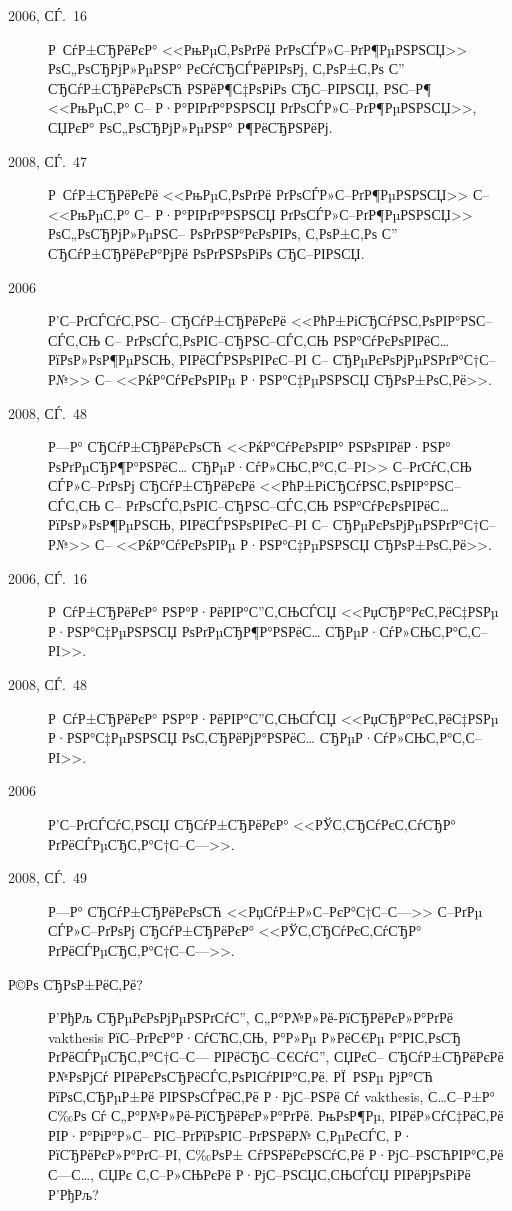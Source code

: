 \documentclass[a4paper]{article}
\newcommand{\vakthesis}{\textsf{vakthesis}}
\begin{document}
\begin{description}
\item[2006, СЃ.~16] Р СѓР±СЂРёРєР° <<РњРµС‚РѕРґРё РґРѕСЃР»С–РґР¶РµРЅРЅСЏ>> РѕС„РѕСЂРјР»РµРЅР° РєСѓСЂСЃРёРІРѕРј,
  С‚РѕР±С‚Рѕ С” СЂСѓР±СЂРёРєРѕСЋ РЅРёР¶С‡РѕРіРѕ СЂС–РІРЅСЏ, РЅС–Р¶ <<РњРµС‚Р° С– Р·Р°РІРґР°РЅРЅСЏ РґРѕСЃР»С–РґР¶РµРЅРЅСЏ>>,
  СЏРєР° РѕС„РѕСЂРјР»РµРЅР° Р¶РёСЂРЅРёРј.

\item[2008, СЃ.~47] Р СѓР±СЂРёРєРё <<РњРµС‚РѕРґРё РґРѕСЃР»С–РґР¶РµРЅРЅСЏ>> С– <<РњРµС‚Р° С– Р·Р°РІРґР°РЅРЅСЏ
  РґРѕСЃР»С–РґР¶РµРЅРЅСЏ>> РѕС„РѕСЂРјР»РµРЅС– РѕРґРЅР°РєРѕРІРѕ, С‚РѕР±С‚Рѕ С” СЂСѓР±СЂРёРєР°РјРё РѕРґРЅРѕРіРѕ СЂС–РІРЅСЏ.

\item[2006] Р’С–РґСЃСѓС‚РЅС– СЂСѓР±СЂРёРєРё <<РћР±РіСЂСѓРЅС‚РѕРІР°РЅС–СЃС‚СЊ С– РґРѕСЃС‚РѕРІС–СЂРЅС–СЃС‚СЊ
  РЅР°СѓРєРѕРІРёС… РїРѕР»РѕР¶РµРЅСЊ, РІРёСЃРЅРѕРІРєС–РІ С– СЂРµРєРѕРјРµРЅРґР°С†С–Р№>> С– <<РќР°СѓРєРѕРІРµ Р·РЅР°С‡РµРЅРЅСЏ
  СЂРѕР±РѕС‚Рё>>.

\item[2008, СЃ.~48] Р—Р° СЂСѓР±СЂРёРєРѕСЋ <<РќР°СѓРєРѕРІР° РЅРѕРІРёР·РЅР° РѕРґРµСЂР¶Р°РЅРёС…
  СЂРµР·СѓР»СЊС‚Р°С‚С–РІ>> С–РґСѓС‚СЊ СЃР»С–РґРѕРј СЂСѓР±СЂРёРєРё <<РћР±РіСЂСѓРЅС‚РѕРІР°РЅС–СЃС‚СЊ С– РґРѕСЃС‚РѕРІС–СЂРЅС–СЃС‚СЊ
  РЅР°СѓРєРѕРІРёС… РїРѕР»РѕР¶РµРЅСЊ, РІРёСЃРЅРѕРІРєС–РІ С– СЂРµРєРѕРјРµРЅРґР°С†С–Р№>> С– <<РќР°СѓРєРѕРІРµ Р·РЅР°С‡РµРЅРЅСЏ
  СЂРѕР±РѕС‚Рё>>.

\item[2006, СЃ.~16] Р СѓР±СЂРёРєР° РЅР°Р·РёРІР°С”С‚СЊСЃСЏ <<РџСЂР°РєС‚РёС‡РЅРµ Р·РЅР°С‡РµРЅРЅСЏ РѕРґРµСЂР¶Р°РЅРёС…
  СЂРµР·СѓР»СЊС‚Р°С‚С–РІ>>.

\item[2008, СЃ.~48] Р СѓР±СЂРёРєР° РЅР°Р·РёРІР°С”С‚СЊСЃСЏ <<РџСЂР°РєС‚РёС‡РЅРµ Р·РЅР°С‡РµРЅРЅСЏ РѕС‚СЂРёРјР°РЅРёС…
  СЂРµР·СѓР»СЊС‚Р°С‚С–РІ>>.

\item[2006] Р’С–РґСЃСѓС‚РЅСЏ СЂСѓР±СЂРёРєР° <<РЎС‚СЂСѓРєС‚СѓСЂР° РґРёСЃРµСЂС‚Р°С†С–С—>>.

\item[2008, СЃ.~49] Р—Р° СЂСѓР±СЂРёРєРѕСЋ <<РџСѓР±Р»С–РєР°С†С–С—>> С–РґРµ СЃР»С–РґРѕРј СЂСѓР±СЂРёРєР°
  <<РЎС‚СЂСѓРєС‚СѓСЂР° РґРёСЃРµСЂС‚Р°С†С–С—>>.

\item[Р©Рѕ СЂРѕР±РёС‚Рё?] Р’РђРљ СЂРµРєРѕРјРµРЅРґСѓС”, С„Р°Р№Р»Рё-РїСЂРёРєР»Р°РґРё \vakthesis{}
  РїС–РґРєР°Р·СѓСЋС‚СЊ, Р°Р»Рµ Р»РёС€Рµ Р°РІС‚РѕСЂ РґРёСЃРµСЂС‚Р°С†С–С— РІРёСЂС–С€СѓС”, СЏРєС– СЂСѓР±СЂРёРєРё Р№РѕРјСѓ
  РІРёРєРѕСЂРёСЃС‚РѕРІСѓРІР°С‚Рё. РЇ~РЅРµ РјР°СЋ РїРѕС‚СЂРµР±Рё РІРЅРѕСЃРёС‚Рё Р·РјС–РЅРё Сѓ \vakthesis{}, С…С–Р±Р°
  С‰Рѕ Сѓ С„Р°Р№Р»Рё-РїСЂРёРєР»Р°РґРё. РњРѕР¶Рµ, РІРёР»СѓС‡РёС‚Рё РІР·Р°РіР°Р»С– РІС–РґРїРѕРІС–РґРЅРёР№ С‚РµРєСЃС‚ Р·
  РїСЂРёРєР»Р°РґС–РІ, С‰РѕР± СѓРЅРёРєРЅСѓС‚Рё Р·РјС–РЅСЋРІР°С‚Рё С—С…, СЏРє С‚С–Р»СЊРєРё Р·РјС–РЅСЏС‚СЊСЃСЏ РІРёРјРѕРіРё
  Р’РђРљ?
\end{description}
\end{document}

